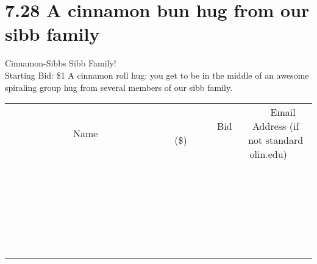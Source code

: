 \documentclass[11pt]{article}
\begin{document}
\section*{7.28 A cinnamon bun hug from our sibb family}
Cinnamon-Sibbs Sibb Family!
\\
Starting Bid: \$1
\newline
A cinnamon roll hug: you get to be in the middle of an awesome spiraling group hug from several members of our sibb family.
\\[6ex]
\begin{tabular}{c c c}
~~~~~~~~~~~~~Name~~~~~~~~~~~~~ & ~~~~~~~~~Bid (\$)~~~~~~~~~  & ~~~Email Address (if not standard olin.edu)~~~\\
 & & \\
\hline
 & & \\
\hline
 & & \\
\hline
 & & \\
\hline
 & & \\
\hline
 & & \\
\hline
 & & \\
\hline
 & & \\
\hline
 & & \\
\hline
 & & \\
\hline
 & & \\
\hline
 & & \\
\hline
 & & \\
\hline
 & & \\
\hline
 & & \\
\hline
 & & \\
\hline
 & & \\
\hline
 & & \\
\hline
 & & \\
\hline
 & & \\
\hline
 & & \\
\hline
 & & \\
\hline
 & & \\
\hline
 & & \\
\hline
 & & \\
\hline
 & & \\
\hline
\end{tabular}
\newpage
\end{document}
